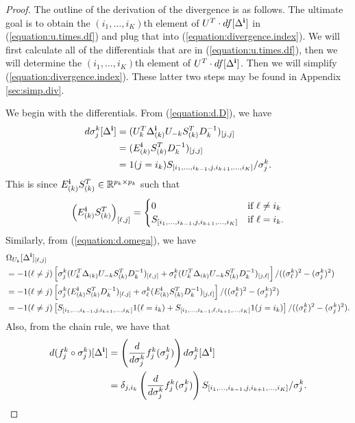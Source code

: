 \begin{proof}
  The outline of the derivation of the divergence is as follows. The
  ultimate goal is to obtain the $(i_1,\ldots,i_K)$th element of $U^T
  \cdot df[\Delta^{\bf i}]$ in (\ref{equation:u.times.df}) and plug
  that into (\ref{equation:divergence.index}). We will first calculate
  all of the differentials that are in (\ref{equation:u.times.df}),
  then we will determine the $(i_1,\ldots,i_K)$th element of $U^T
  \cdot df[\Delta^{\bf i}]$. Then we will simplify
  (\ref{equation:divergence.index}). These latter two steps may be
  found in Appendix \ref{sec:simp.div}.

  We begin with the differentials. From (\ref{equation:d.D}), we have
  \begin{align}
    d\sigma_j^k[\Delta^{\bf i}] &= (U_k^T \Delta_{(k)}^{\bf i} U_{-k} S_{(k)}^T D_k^{-1})_{[j,j]} \nonumber\\
    &= (E^{\bf i}_{(k)} S_{(k)}^T D_k^{-1})_{[j,j]}\nonumber\\
    \label{equation:d.sigma.i}
    &= 1(j = i_k)S_{[i_1,\ldots,i_{k-1},j,i_{k+1},\ldots,i_K]}/\sigma_j^k.
  \end{align}
  This is since $E_{(k)}^{\bf i}S_{(k)}^T \in \mathbb{R}^{p_k\times p_k}$ such that
  \begin{align}
    \left(E_{(k)}^{\bf i}S_{(k)}^T\right)_{[\ell,j]} = \label{equation:Ek.Sk}
    \begin{cases}
      0 &\text{if } \ell \neq i_k\\
      S_{[i_1,\ldots,i_{k-1},j,i_{k+1},\ldots,i_K]} &\text{if } \ell = i_k.
    \end{cases}
  \end{align}
  Similarly, from (\ref{equation:d.omega}), we have
  \begin{align}
    &\Omega_{U_k}[\Delta^{\bf i}]_{[\ell, j]} \nonumber\\
    &= -1(\ell\neq j)\left[\sigma_j^k(U_k^T\Delta_{(k)}U_{-k}S_{(k)}^TD_k^{-1})_{[\ell,j]} + \sigma_{\ell}^k(U_k^T\Delta_{(k)}U_{-k}S_{(k)}^TD_k^{-1})_{[j,\ell]}\right]/((\sigma_{\ell}^k)^2 - (\sigma_j^k)^2)\nonumber\\
    &= -1(\ell\neq j)\left[\sigma_j^k(E^{\bf i}_{(k)}S_{(k)}^TD_k^{-1})_{[\ell,j]} + \sigma_{\ell}^k(E^{\bf i}_{(k)}S_{(k)}^TD_k^{-1})_{[j,\ell]}\right]/ ((\sigma_{\ell}^k)^2 - (\sigma_j^k)^2)\nonumber\\
    \label{equation:d.omega.i}
    &= -1(\ell\neq j)\left[S_{[i_1,\ldots,i_{k-1},j,i_{k+1},\ldots,i_K]}1(\ell = i_k) + S_{[i_1,\ldots,i_{k-1},\ell,i_{k+1},\ldots,i_K]}1(j=i_k)\right]/((\sigma_{\ell}^k)^2 - (\sigma_j^k)^2).
  \end{align}
  Also, from the chain rule, we have that
  \begin{align}
    d(f^k_j \circ \sigma^k_j)[\Delta^{\bf i}] &= \left(\frac{d}{d\sigma_j^k}f_j^k(\sigma_j^k)\right)d\sigma_j^k[\Delta^{\bf i}]\nonumber\\
    \label{equation:d.comp}
    &= \delta_{j,i_k}\left(\frac{d}{d\sigma_j^k}f_j^k(\sigma_j^k)\right)S_{[i_1,\ldots,i_{k-1},j,i_{k+1},\ldots,i_K]}/\sigma_j^k.
  \end{align}


\end{proof}
